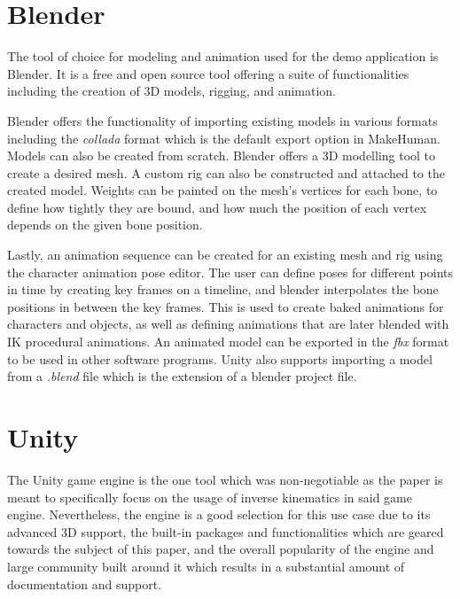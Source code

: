 \section{Blender}
The tool of choice for modeling and animation used for the demo application is
Blender. It is a free and open source tool offering a suite of functionalities
including the creation of 3D models, rigging, and animation. 


Blender offers the functionality of importing existing models in various formats
including the \textit{collada} format \cite{collada} which is the default export
option in MakeHuman. Models can also be created from scratch. Blender offers
a 3D modelling tool to create a desired mesh. A custom rig can also be
constructed and attached to the created model. Weights can be painted on the
mesh's vertices for each bone, to define how tightly they are bound, and how
much the position of each vertex depends on the given bone position. 

Lastly, an animation sequence can be created for an existing mesh and rig using
the character animation pose editor. The user can define poses for different
points in time by creating key frames on a timeline, and blender interpolates the
bone positions in between the key frames. This is used to create baked animations
for characters and objects, as well as defining animations that are later
blended with IK procedural animations. An animated model can be exported in the
\textit{fbx} format to be used in other software programs. Unity also supports
importing a model from a \textit{.blend} file which is the extension of
a blender project file. 


\section{Unity}
The Unity game engine is the one tool which was non-negotiable as the paper
is meant to specifically focus on the usage of inverse kinematics in said game
engine. Nevertheless, the engine is a good selection for this use case due to
its advanced 3D support, the built-in packages and functionalities which are
geared towards the subject of this paper, and the overall popularity of the
engine and large community built around it which results in a substantial amount
of documentation and support. 

